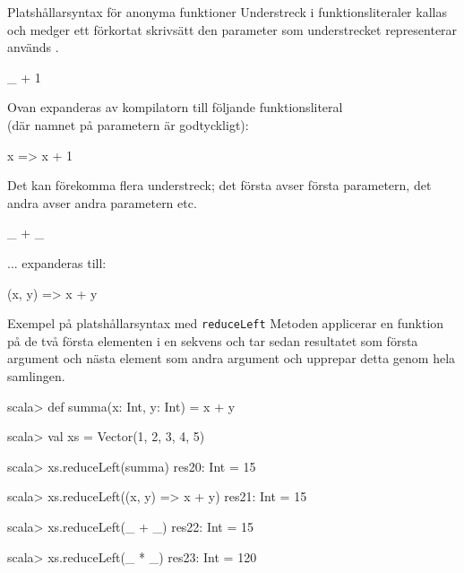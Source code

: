\begin{Slide}{Platshållarsyntax för anonyma funktioner}\SlideFontSmall
Understreck i funktionsliteraler kallas   och medger ett förkortat skrivsätt  den parameter som understrecket representerar används .
\begin{Code}[basicstyle=\ttfamily\fontsize{10}{12}\selectfont]
_ + 1
\end{Code}
Ovan expanderas av kompilatorn till följande funktionsliteral \\(där namnet på parametern är godtyckligt):
\begin{Code}[basicstyle=\ttfamily\fontsize{10}{12}\selectfont]
x => x + 1
\end{Code}
\pause
Det kan förekomma flera understreck; det första avser första parametern, det andra avser andra parametern etc.
\begin{Code}[basicstyle=\ttfamily\fontsize{10}{12}\selectfont]
_ + _
\end{Code}
\pause
... expanderas till:
\begin{Code}[basicstyle=\ttfamily\fontsize{10}{12}\selectfont]
(x, y) => x + y
\end{Code}
\end{Slide}


\begin{Slide}{Exempel på platshållarsyntax med \texttt{reduceLeft}}\SlideFontSmall
Metoden  applicerar en funktion på de två första elementen i en sekvens och tar sedan resultatet som första argument och nästa element som andra argument och upprepar detta genom hela samlingen.
\begin{REPL}
scala> def summa(x: Int, y: Int) = x + y

scala> val xs = Vector(1, 2, 3, 4, 5)

scala> xs.reduceLeft(summa)
res20: Int = 15

scala> xs.reduceLeft((x, y) => x + y)
res21: Int = 15

scala> xs.reduceLeft(_ + _)
res22: Int = 15

scala> xs.reduceLeft(_ * _)
res23: Int = 120
\end{REPL}
\end{Slide}


